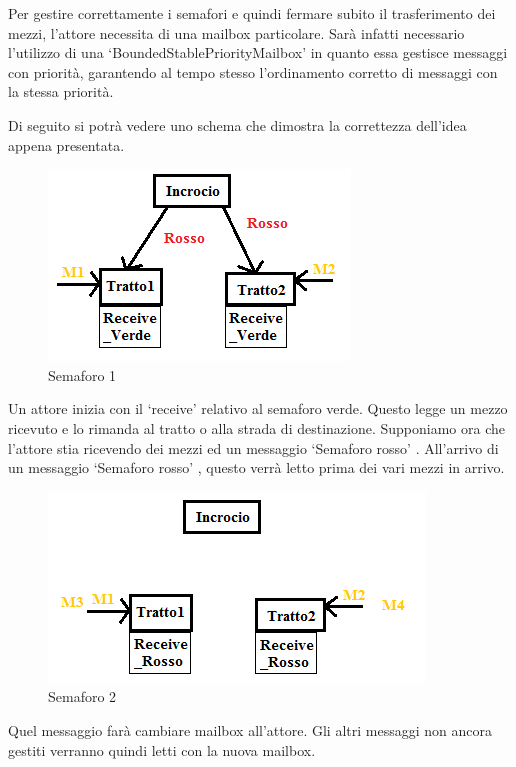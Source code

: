 \documentclass{article}
\begin{document}
Per gestire correttamente i semafori e quindi fermare subito il trasferimento dei mezzi, l\textquoteright{}attore necessita di una mailbox particolare. Sar\`{a} infatti necessario l\textquoteright{}utilizzo di una \lq BoundedStablePriorityMailbox\rq{} in quanto essa gestisce messaggi con priorit\`{a}, garantendo al tempo stesso l\textquoteright{}ordinamento corretto di messaggi con la stessa priorit\`{a}. 
\par Di seguito si potr\`{a} vedere uno schema che dimostra la correttezza dell\textquoteright{}idea appena presentata.
\begin{figure}[H]
\begin{center}
\includegraphics{./img/Semaforo1.png}
\caption{Semaforo 1}
\label{fig:Semaforo 1}
\end{center}
\end{figure}
Un attore inizia con il \lq receive\rq{} relativo al semaforo verde. Questo legge un mezzo ricevuto e lo rimanda al tratto o alla strada di destinazione. Supponiamo ora che l\textquoteright{}attore stia ricevendo dei mezzi ed un messaggio \lq Semaforo rosso\rq{} . All\textquoteright{}arrivo di un messaggio \lq Semaforo rosso\rq{} , questo verr\`{a} letto prima dei vari mezzi in arrivo.
\begin{figure}[H]
\begin{center}
\includegraphics{./img/Semaforo2.png}
\caption{Semaforo 2}
\label{fig:Semaforo 2}
\end{center}
\end{figure}
Quel messaggio far\`{a} cambiare mailbox all\textquoteright{}attore. Gli altri messaggi non ancora gestiti verranno quindi letti con la nuova mailbox. 
\end{document}
